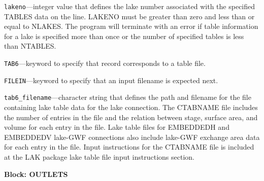 \begin{description}
\item \texttt{lakeno}---integer value that defines the lake number associated with the specified TABLES data on the line. LAKENO must be greater than zero and less than or equal to NLAKES. The program will terminate with an error if table information for a lake is specified more than once or the number of specified tables is less than NTABLES.

\item \texttt{TAB6}---keyword to specify that record corresponds to a table file.

\item \texttt{FILEIN}---keyword to specify that an input filename is expected next.

\item \texttt{tab6\_filename}---character string that defines the path and filename for the file containing lake table data for the lake connection. The CTABNAME file includes the number of entries in the file and the relation between stage, surface area, and volume for each entry in the file. Lake table files for EMBEDDEDH and EMBEDDEDV lake-GWF connections also include lake-GWF exchange area data for each entry in the file. Input instructions for the CTABNAME file is included at the LAK package lake table file input instructions section.

\end{description}
\item \textbf{Block: OUTLETS}

